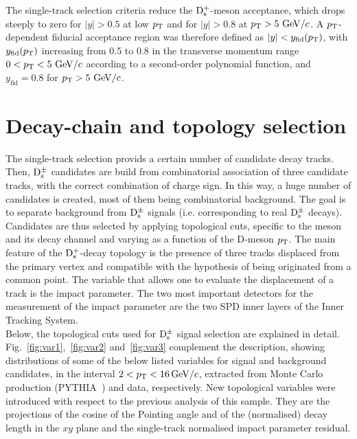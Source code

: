The single-track selection criteria reduce the ${\rm D_s^+}$-meson acceptance, which drops 
steeply to zero for $|y| > 0.5$ at low $p_{\rm T}$ and for $|y| > 0.8$ 
at $p_{\rm T} > 5~\mathrm{GeV}/c$. A $p_{\rm T}$-dependent fiducial acceptance region was therefore defined as 
$|y| < y_{\mathrm{fid}}(p_{\rm T})$, with $y_{\mathrm{fid}}(p_{\rm T})$ increasing 
from 0.5 to 0.8 in the transverse momentum range $0 < p_{\rm T} < 5~\mathrm{GeV}/c$ 
according to a second-order polynomial function, and $y_{\mathrm{fid}}=0.8$ 
for $p_{\rm T} > 5~\mathrm{GeV}/c$.

\section{Decay-chain and topology selection}
\label{sec:topolPP}
The single-track selection provids a certain number of candidate
 decay tracks. Then, ${\rm D_s^{\pm}}$ candidates are build from combinatorial 
 association of three candidate tracks, with the correct combination of charge 
 sign. In this way, a huge number of candidates is created, most of them 
 being combinatorial background. The goal is to separate background from
  ${\rm D_s^{\pm}}$ signals (i.e. corresponding to real  ${\rm D_s^{\pm}}$ decays). Candidates 
  are thus selected by applying topological cuts, specific to the meson and its 
  decay channel and varying as a function of the D-meson $p_{\rm T}$.
The main feature of the ${\rm D_s^+}$-decay topology is the presence of three tracks displaced from 
the primary vertex and compatible with the hypothesis of being originated from 
a common point. 
The variable that allows one to evaluate the displacement of a track is the 
impact parameter. The two most important detectors for the measurement
 of the impact parameter are the two SPD inner layers of the Inner Tracking System. \\
Below, the topological cuts used for ${\rm D_s^{\pm}}$ signal selection
 are explained in detail. Fig.~\ref{fig:var1},~\ref{fig:var2} and~\ref{fig:var3} complement
 the description, showing distributions of some of the below listed variables
 for signal and background candidates, in the interval $2 < p_{\rm T} < 16 \, \mathrm{GeV}/c$, 
 extracted from Monte Carlo production (PYTHIA~\cite{Sjostrand:2006za}) and data, respectively.
  New topological variables were introduced with respect to the 
  previous analysis of this sample. They are the projections of the cosine of 
the Pointing angle and of the (normalised) decay length in the $xy$ plane 
 and the single-track normalised impact parameter residual.
